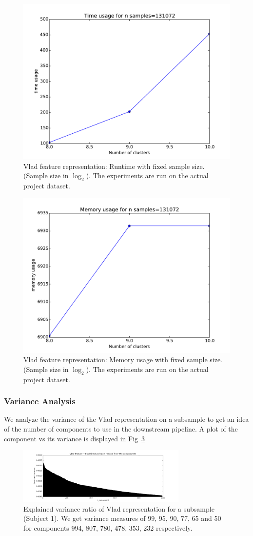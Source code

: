 \documentclass[final,leqno,onefignum,onetabnum]{siamltexmm}
\begin{document}
\begin{figure}
  \centering
  \includegraphics[width=0.60\linewidth]{images/vladTimeFixedSample}
  \caption{Vlad feature representation: Runtime with fixed sample size. (Sample size in $\log_{2}$).  The experiments are run on the actual project dataset.\label{fig:vlad_time_fixed_sample}}
\end{figure}
\begin{figure}
  \centering
  \includegraphics[width=0.60\linewidth]{images/vladMemoryFixedSample}
  \caption{Vlad feature representation: Memory usage with fixed sample size. (Sample size in $\log_{2}$).  The experiments are run on the actual project dataset.\label{fig:vlad_memory_fixed_sample}}
\end{figure}

\subsubsection{Variance Analysis}
We analyze the variance of the Vlad representation on a subsample to get an idea of the number of components to use in the downstream pipeline.  A plot of the component vs its variance is displayed in Fig~\ref{fig:vlad_variance}
\begin{figure}
  \centering
  \includegraphics[width=0.75\textwidth]{images/vlad_variance}
  \caption{Explained variance ratio of Vlad representation for a subsample (Subject 1).  We get variance measures of 99, 95, 90, 77, 65 and 50 for components 994, 807, 780, 478, 353, 232 respectively.\label{fig:vlad_variance}} 
\end{figure}
\end{document}
